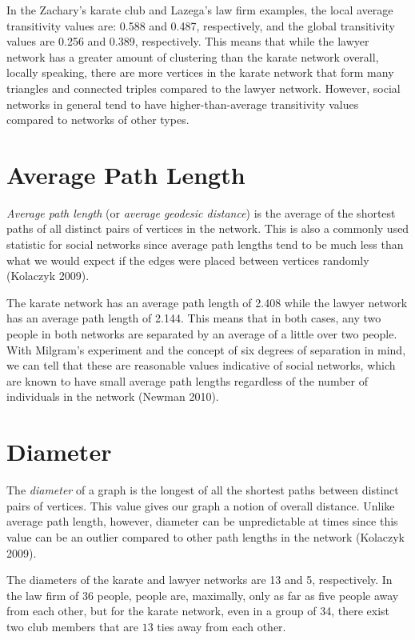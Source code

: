 \documentclass[12pt,twoside]{amherstthesis}
\begin{document}
  In the Zachary's karate club and Lazega's law firm examples, the local
  average transitivity values are: 0.588 and 0.487, respectively, and the
  global transitivity values are 0.256 and 0.389, respectively. This means
  that while the lawyer network has a greater amount of clustering than
  the karate network overall, locally speaking, there are more vertices in
  the karate network that form many triangles and connected triples
  compared to the lawyer network. However, social networks in general tend
  to have higher-than-average transitivity values compared to networks of
  other types.
  
  \section{Average Path Length}\label{average-path-length}
  
  \emph{Average path length} (or \emph{average geodesic distance}) is the
  average of the shortest paths of all distinct pairs of vertices in the
  network. This is also a commonly used statistic for social networks
  since average path lengths tend to be much less than what we would
  expect if the edges were placed between vertices randomly (Kolaczyk
  2009).
  
  The karate network has an average path length of 2.408 while the lawyer
  network has an average path length of 2.144. This means that in both
  cases, any two people in both networks are separated by an average of a
  little over two people. With Milgram's experiment and the concept of six
  degrees of separation in mind, we can tell that these are reasonable
  values indicative of social networks, which are known to have small
  average path lengths regardless of the number of individuals in the
  network (Newman 2010).
  
  \section{Diameter}\label{diameter}
  
  The \emph{diameter} of a graph is the longest of all the shortest paths
  between distinct pairs of vertices. This value gives our graph a notion
  of overall distance. Unlike average path length, however, diameter can
  be unpredictable at times since this value can be an outlier compared to
  other path lengths in the network (Kolaczyk 2009).
  
  The diameters of the karate and lawyer networks are 13 and 5,
  respectively. In the law firm of 36 people, people are, maximally, only
  as far as five people away from each other, but for the karate network,
  even in a group of 34, there exist two club members that are \(13\) ties
  away from each other.
  
\end{document}

